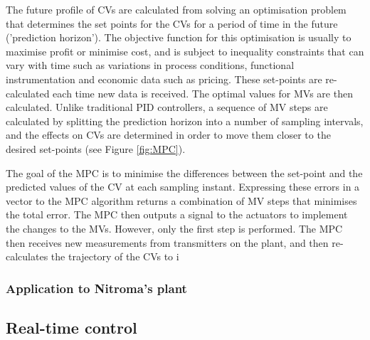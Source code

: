 The future profile of CVs are calculated from solving an optimisation problem that determines the set points for the CVs for a period of time in the future ('prediction horizon'). The objective function for this optimisation is usually to maximise profit or minimise cost, and is subject to inequality constraints that can vary with time such as variations in process conditions, functional instrumentation and economic data such as pricing. These set-points are re-calculated each time new data is received. The optimal values for MVs are then calculated. Unlike traditional PID controllers, a sequence of MV steps are calculated by splitting the prediction horizon into a number of sampling intervals, and the effects on CVs are determined in order to move them closer to the desired set-points (see Figure \ref{fig:MPC}). 

The goal of the MPC is to minimise the differences between the set-point and the predicted values of the CV at each sampling instant. Expressing these errors in a vector to the MPC algorithm returns a combination of MV steps that minimises the total error. The MPC then outputs a signal to the actuators to implement the changes to the MVs. However, only the first step is performed. The MPC then receives new measurements from transmitters on the plant, and then re-calculates the trajectory of the CVs to i  

\subsubsection{Application to Nitroma's plant}


\subsection{Real-time control}